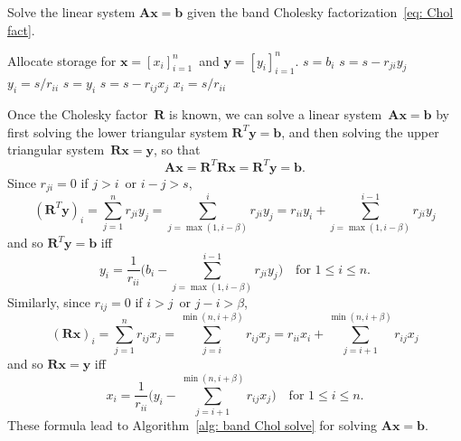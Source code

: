 \begin{algorithm}
\caption{Solve the linear system $\boldsymbol{A}\boldsymbol{x}=\boldsymbol{b}$ 
given the band Cholesky factorization~\eqref{eq: Chol fact}.}
\label{alg: band Chol solve}
\begin{algorithmic}
\State
{}
\State Allocate storage for $\boldsymbol{x}=[x_i]_{i=1}^n$~and
$\boldsymbol{y}=[y_i]_{i=1}^n$.
    \State $s=b_i$
        \State $s=s-r_{ji}y_j$
    \EndFor
    \State $y_i=s/r_{ii}$
\EndFor
{}
    \State $s=y_i$
        \State $s=s-r_{ij}x_j$
    \EndFor
    \State $x_i=s/r_{ii}$
\EndFor
\State{}
\EndFunction
\end{algorithmic}
\end{algorithm}

Once the Cholesky factor~$\boldsymbol{R}$ is known, we can solve a linear 
system~$\boldsymbol{A}\boldsymbol{x}=\boldsymbol{b}$ by first solving the lower 
triangular system $\boldsymbol{R}^T\boldsymbol{y}=\boldsymbol{b}$, and then 
solving the upper triangular 
system~$\boldsymbol{R}\boldsymbol{x}=\boldsymbol{y}$, so that
\[
\boldsymbol{A}\boldsymbol{x}=\boldsymbol{R}^T\boldsymbol{R}\boldsymbol{x}
	=\boldsymbol{R}^T\boldsymbol{y}=\boldsymbol{b}.
\]
Since $r_{ji}=0$ if $j>i$~or $i-j>s$,
\[
(\boldsymbol{R}^T\boldsymbol{y})_i=\sum_{j=1}^nr_{ji}y_j
	=\sum_{j=\max(1,i-\beta)}^ir_{ji}y_j
	=r_{ii}y_i+\sum_{j=\max(1,i-\beta)}^{i-1}r_{ji}y_j
\]
and so $\boldsymbol{R}^T\boldsymbol{y}=\boldsymbol{b}$ iff
\[
y_i=\frac{1}{r_{ii}}\biggl(b_i-\sum_{j=\max(1,i-\beta)}^{i-1}r_{ji}y_j\biggr)
\quad\text{for $1\le i\le n$.}
\]
Similarly, since $r_{ij}=0$ if $i>j$~or $j-i>\beta$,
\[
(\boldsymbol{R}\boldsymbol{x})_i=\sum_{j=1}^nr_{ij}x_j
	=\sum_{j=i}^{\min(n,i+\beta)}r_{ij}x_j
	=r_{ii}x_i+\sum_{j=i+1}^{\min(n,i+\beta)}r_{ij}x_j
\]
and so $\boldsymbol{R}\boldsymbol{x}=\boldsymbol{y}$ iff
\[
x_i=\frac{1}{r_{ii}}\biggl(y_i-\sum_{j=i+1}^{\min(n,i+\beta)}r_{ij}x_j\biggr)
	\quad\text{for $1\le i\le n$.}
\]
These formula lead to Algorithm~\ref{alg: band Chol solve} for solving 
$\boldsymbol{A}\boldsymbol{x}=\boldsymbol{b}$.

